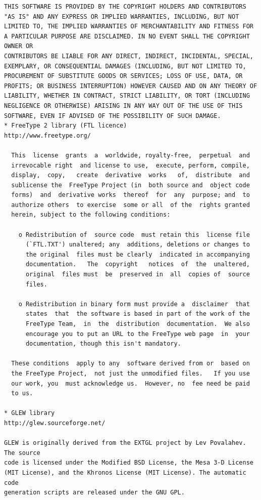 \documentclass{article}
\begin{document}
\begin{lstlisting}
THIS SOFTWARE IS PROVIDED BY THE COPYRIGHT HOLDERS AND CONTRIBUTORS
"AS IS" AND ANY EXPRESS OR IMPLIED WARRANTIES, INCLUDING, BUT NOT
LIMITED TO, THE IMPLIED WARRANTIES OF MERCHANTABILITY AND FITNESS FOR
A PARTICULAR PURPOSE ARE DISCLAIMED. IN NO EVENT SHALL THE COPYRIGHT OWNER OR
CONTRIBUTORS BE LIABLE FOR ANY DIRECT, INDIRECT, INCIDENTAL, SPECIAL,
EXEMPLARY, OR CONSEQUENTIAL DAMAGES (INCLUDING, BUT NOT LIMITED TO,
PROCUREMENT OF SUBSTITUTE GOODS OR SERVICES; LOSS OF USE, DATA, OR
PROFITS; OR BUSINESS INTERRUPTION) HOWEVER CAUSED AND ON ANY THEORY OF
LIABILITY, WHETHER IN CONTRACT, STRICT LIABILITY, OR TORT (INCLUDING
NEGLIGENCE OR OTHERWISE) ARISING IN ANY WAY OUT OF THE USE OF THIS
SOFTWARE, EVEN IF ADVISED OF THE POSSIBILITY OF SUCH DAMAGE.
* FreeType 2 library (FTL licence)
http://www.freetype.org/

  This  license  grants  a  worldwide, royalty-free,  perpetual  and
  irrevocable right  and license to use,  execute, perform, compile,
  display,  copy,   create  derivative  works   of,  distribute  and
  sublicense the  FreeType Project (in  both source and  object code
  forms)  and  derivative works  thereof  for  any  purpose; and  to
  authorize others  to exercise  some or all  of the  rights granted
  herein, subject to the following conditions:

    o Redistribution of  source code  must retain this  license file
      (`FTL.TXT') unaltered; any  additions, deletions or changes to
      the original  files must be clearly  indicated in accompanying
      documentation.   The  copyright   notices  of  the  unaltered,
      original  files must  be  preserved in  all  copies of  source
      files.

    o Redistribution in binary form must provide a  disclaimer  that
      states  that  the software is based in part of the work of the
      FreeType Team,  in  the  distribution  documentation.  We also
      encourage you to put an URL to the FreeType web page  in  your
      documentation, though this isn't mandatory.

  These conditions  apply to any  software derived from or  based on
  the FreeType Project,  not just the unmodified files.   If you use
  our work, you  must acknowledge us.  However, no  fee need be paid
  to us.

* GLEW library
http://glew.sourceforge.net/

GLEW is originally derived from the EXTGL project by Lev Povalahev. The source
code is licensed under the Modified BSD License, the Mesa 3-D License
(MIT License), and the Khronos License (MIT License). The automatic code
generation scripts are released under the GNU GPL. 


\end{lstlisting}
\end{document}
